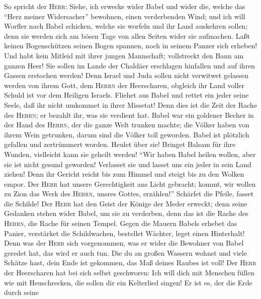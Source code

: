  So spricht der \textsc{Herr}: Siehe, ich erwecke wider
Babel und wider die, welche das ``Herz meiner Widersacher'' bewohnen,
einen verderbenden Wind;  und ich will Worfler nach Babel
schicken, welche sie worfeln und ihr Land auskehren sollen; denn sie
werden sich am bösen Tage von allen Seiten wider sie aufmachen.
 Laßt keinen Bogenschützen seinen Bogen spannen, noch in
seinem Panzer sich erheben! Und habt kein Mitleid mit ihrer jungen
Mannschaft; vollstreckt den Bann am ganzen Heer!  Sie
sollen im Lande der Chaldäer erschlagen hinfallen und auf ihren Gassen
erstochen werden!  Denn Israel und Juda sollen nicht
verwitwet gelassen werden von ihrem Gott, dem \textsc{Herrn} der
Heerscharen, obgleich ihr Land voller Schuld ist vor dem Heiligen
Israels.  Fliehet aus Babel und rettet ein jeder seine
Seele, daß ihr nicht umkommet in ihrer Missetat! Denn dies ist die Zeit
der Rache des \textsc{Herrn}; er bezahlt ihr, was sie verdient hat.
 Babel war ein goldener Becher in der Hand des
\textsc{Herrn}, der die ganze Welt trunken machte; die Völker haben von
ihrem Wein getrunken, darum sind die Völker toll geworden.
 Babel ist plötzlich gefallen und zertrümmert worden.
Heulet über sie! Bringet Balsam für ihre Wunden, vielleicht kann sie
geheilt werden!  ``Wir haben Babel heilen wollen, aber sie
ist nicht gesund geworden! Verlasset sie und lasset uns ein jeder in
sein Land ziehen! Denn ihr Gericht reicht bis zum Himmel und steigt bis
zu den Wolken empor.  Der \textsc{Herr} hat unsere
Gerechtigkeit ans Licht gebracht; kommt, wir wollen zu Zion das Werk des
\textsc{Herrn}, unsres Gottes, erzählen!''  Schärfet die
Pfeile, fasset die Schilde! Der \textsc{Herr} hat den Geist der Könige
der Meder erweckt; denn seine Gedanken stehen wider Babel, um sie zu
verderben, denn das ist die Rache des \textsc{Herrn}, die Rache für
seinen Tempel.  Gegen die Mauern Babels erhebet das
Panier, verstärket die Schildwachen, bestellet Wächter, leget einen
Hinterhalt! Denn was der \textsc{Herr} sich vorgenommen, was er wider
die Bewohner von Babel geredet hat, das wird er auch tun.
 Die du an großen Wassern wohnst und viele Schätze hast,
dein Ende ist gekommen, das Maß deines Raubes ist voll! 
Der \textsc{Herr} der Heerscharen hat bei sich selbst geschworen: Ich
will dich mit Menschen füllen wie mit Heuschrecken, die sollen dir ein
Kelterlied singen!  Er ist es, der die Erde durch seine
